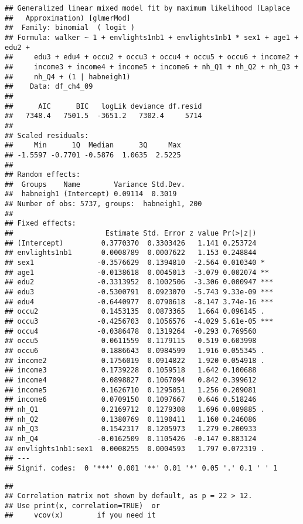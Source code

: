 \documentclass[
]{book}
\begin{document}
\begin{verbatim}
## Generalized linear mixed model fit by maximum likelihood (Laplace
##   Approximation) [glmerMod]
##  Family: binomial  ( logit )
## Formula: walker ~ 1 + envlights1nb1 + envlights1nb1 * sex1 + age1 + edu2 +  
##     edu3 + edu4 + occu2 + occu3 + occu4 + occu5 + occu6 + income2 +  
##     income3 + income4 + income5 + income6 + nh_Q1 + nh_Q2 + nh_Q3 +  
##     nh_Q4 + (1 | habneigh1)
##    Data: df_ch4_09
## 
##      AIC      BIC   logLik deviance df.resid 
##   7348.4   7501.5  -3651.2   7302.4     5714 
## 
## Scaled residuals: 
##     Min      1Q  Median      3Q     Max 
## -1.5597 -0.7701 -0.5876  1.0635  2.5225 
## 
## Random effects:
##  Groups    Name        Variance Std.Dev.
##  habneigh1 (Intercept) 0.09114  0.3019  
## Number of obs: 5737, groups:  habneigh1, 200
## 
## Fixed effects:
##                      Estimate Std. Error z value Pr(>|z|)    
## (Intercept)         0.3770370  0.3303426   1.141 0.253724    
## envlights1nb1       0.0008789  0.0007622   1.153 0.248844    
## sex1               -0.3576629  0.1394810  -2.564 0.010340 *  
## age1               -0.0138618  0.0045013  -3.079 0.002074 ** 
## edu2               -0.3313952  0.1002506  -3.306 0.000947 ***
## edu3               -0.5300791  0.0923070  -5.743 9.33e-09 ***
## edu4               -0.6440977  0.0790618  -8.147 3.74e-16 ***
## occu2               0.1453135  0.0873365   1.664 0.096145 .  
## occu3              -0.4256703  0.1056576  -4.029 5.61e-05 ***
## occu4              -0.0386478  0.1319264  -0.293 0.769560    
## occu5               0.0611559  0.1179115   0.519 0.603998    
## occu6               0.1886643  0.0984599   1.916 0.055345 .  
## income2             0.1756019  0.0914822   1.920 0.054918 .  
## income3             0.1739228  0.1059518   1.642 0.100688    
## income4             0.0898827  0.1067094   0.842 0.399612    
## income5             0.1626710  0.1295051   1.256 0.209081    
## income6             0.0709150  0.1097667   0.646 0.518246    
## nh_Q1               0.2169712  0.1279308   1.696 0.089885 .  
## nh_Q2               0.1380769  0.1190411   1.160 0.246086    
## nh_Q3               0.1542317  0.1205973   1.279 0.200933    
## nh_Q4              -0.0162509  0.1105426  -0.147 0.883124    
## envlights1nb1:sex1  0.0008255  0.0004593   1.797 0.072319 .  
## ---
## Signif. codes:  0 '***' 0.001 '**' 0.01 '*' 0.05 '.' 0.1 ' ' 1
\end{verbatim}

\begin{verbatim}
## 
## Correlation matrix not shown by default, as p = 22 > 12.
## Use print(x, correlation=TRUE)  or
##     vcov(x)        if you need it
\end{verbatim}
\end{document}

